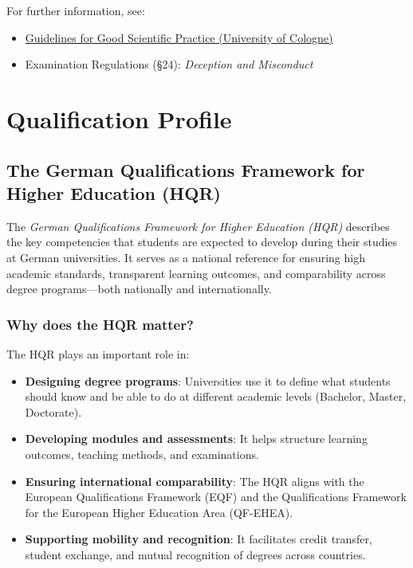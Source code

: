 \documentclass[
  letterpaper,
  10pt,
  openany]{book}
\providecommand{\tightlist}{%
  \setlength{\itemsep}{0pt}\setlength{\parskip}{0pt}}\usepackage{longtable,booktabs,array}
\begin{document}
For further information, see:

\begin{itemize}
\tightlist
\item
  \href{https://portal.uni-koeln.de/en/research/scientific-principles/safeguarding-good-scientific-practice}{Guidelines
  for Good Scientific Practice (University of Cologne)}\\
\item
  Examination Regulations (§24): \emph{Deception and Misconduct}
\end{itemize}

\chapter*{Qualification Profile}\label{qualification-profile}


\section*{The German Qualifications Framework for Higher Education
(HQR)}\label{the-german-qualifications-framework-for-higher-education-hqr}


The \emph{German Qualifications Framework for Higher Education (HQR)}
describes the key competencies that students are expected to develop
during their studies at German universities. It serves as a national
reference for ensuring high academic standards, transparent learning
outcomes, and comparability across degree programs---both nationally and
internationally.

\subsection*{Why does the HQR matter?}\label{why-does-the-hqr-matter}

The HQR plays an important role in:

\begin{itemize}
\tightlist
\item
  \textbf{Designing degree programs}: Universities use it to define what
  students should know and be able to do at different academic levels
  (Bachelor, Master, Doctorate).
\item
  \textbf{Developing modules and assessments}: It helps structure
  learning outcomes, teaching methods, and examinations.
\item
  \textbf{Ensuring international comparability}: The HQR aligns with the
  European Qualifications Framework (EQF) and the Qualifications
  Framework for the European Higher Education Area (QF-EHEA).
\item
  \textbf{Supporting mobility and recognition}: It facilitates credit
  transfer, student exchange, and mutual recognition of degrees across
  countries.
\end{itemize}
\end{document}
